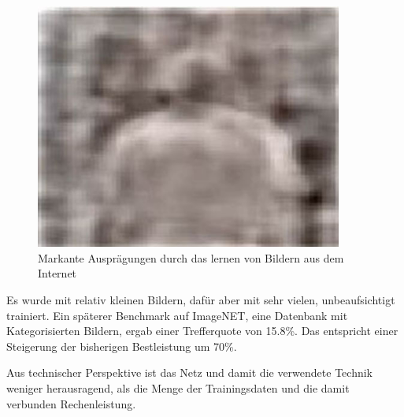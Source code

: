 \begin{figure}
{\begin{minipage}{0.33\textwidth}
	\includegraphics[width=0.9\textwidth]{images/neuron-body.jpg}\end{minipage}}
\caption{Markante Ausprägungen durch das lernen von Bildern aus dem Internet}
\label{fig:neurons-google}
\end{figure}

Es wurde mit relativ kleinen Bildern, dafür aber mit sehr vielen, unbeaufsichtigt trainiert. Ein späterer Benchmark auf ImageNET, eine Datenbank mit Kategorisierten Bildern, ergab einer Trefferquote von 15.8\%. Das entspricht einer Steigerung der bisherigen Bestleistung um 70\%.

Aus technischer Perspektive ist das Netz und damit die verwendete Technik weniger herausragend, als die Menge der Trainingsdaten und die damit verbunden Rechenleistung.

